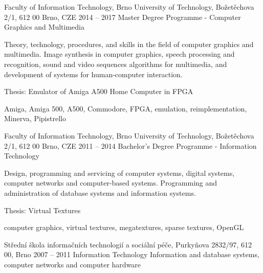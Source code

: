 \documentclass[localFont,alternative]{yaac-another-awesome-cv}
\newcommand{\dumblang}[2]{{#2}}
\begin{document}
	\sectionTitle{\dumblang{Vzdělání}{Education}}{\faGraduationCap}
	\begin{projects}
		\project
			{\dumblang
				{Fakulta informačních technologií VUT v Brně, Božetěchova 2/1, 612 00 Brno}
				{Faculty of Information Technology, Brno University of Technology, Božetěchova 2/1, 612 00 Brno, CZE}}
			{2014 -- 2017}
			{\dumblang
				{Magisterský studijní program - Počítačová grafika a multimédia}
				{Master Degree Programme - Computer Graphics and Multimedia}}
			{\dumblang
				{Teorie, technologie, postupy a dovednosti v oblasti počítačové grafiky a multimédií. Syntéza obrazů v počítačové grafice, zpracování a rozpoznávání řeči, algoritmy pro práci se zvukem a videosekvencemi v multimédiích a tvorba systémů pro komunikaci člověka s počítačem.}
				{Theory, technology, procedures, and skills in the field of computer graphics and multimedia. Image synthesis in computer graphics, speech processing and recognition, sound and video sequences algorithms for multimedia, and development of systems for human-computer interaction.}
			
			\bigskip
			
			\dumblang
				{Závěrečná práce: Emulátor domácího počítače Amiga A500 v FPGA}
				{Thesis: Emulator of Amiga A500 Home Computer in FPGA}}
			{Amiga, Amiga 500, A500, Commodore, FPGA, \dumblang{emulace}{emulation}, \dumblang{reimplementace}{reimplementation}, Minerva, Pipistrello}
		
		\project
			{\dumblang
				{Fakulta informačních technologií VUT v Brně, Božetěchova 2/1, 612 00 Brno}
				{Faculty of Information Technology, Brno University of Technology, Božetěchova 2/1, 612 00 Brno, CZE}}
			{2011 -- 2014}
			{Bachelor's Degree Programme - Information Technology}
			{\dumblang
				{Konstrukce, programování a údržba počítačových systémů a číslicových zařízení, konfigurace počítačů, počítačových sítí a systémů založených na počítačích.}
				{Design, programming and servicing of computer systems, digital systems, computer networks and computer-based systems. Programming and administration of database systems and information systems.}
			
			\bigskip
			
			Thesis: Virtual Textures}
			{
				\dumblang{počítačová grafika}{computer graphics},
				\dumblang{virtuální textury}{virtual textures},
				\dumblang{megatexture}{megatextures},
				sparse textures,
				OpenGL
			}
		
		\project
			{Střední škola informačních technologií a sociální péče, Purkyňova 2832/97, 612 00, Brno}
			{2007 -- 2011}
			{\dumblang{Informační technologie}{Information Technology}}
			{\dumblang
				{Informační a databázové systémy, počítačové sítě, technické vybavení}
				{Information and database systems, computer networks and computer hardware}}
			{}
	\end{projects}
\end{document}
